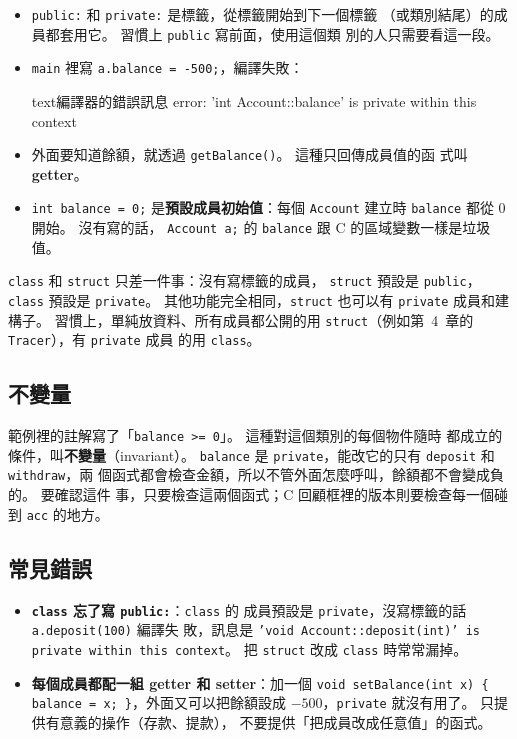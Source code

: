 \begin{itemize}
\item \texttt{public:} 和 \texttt{private:} 是標籤，從標籤開始到下一個標籤
（或類別結尾）的成員都套用它。 習慣上 \texttt{public} 寫前面，使用這個類
別的人只需要看這一段。
\item \texttt{main} 裡寫 \texttt{a.balance = -500;}，編譯失敗：
\begin{code}{text}{編譯器的錯誤訊息}
error: 'int Account::balance' is private within this context
\end{code}
\item 外面要知道餘額，就透過 \texttt{getBalance()}。 這種只回傳成員值的函
式叫 \textbf{getter}。
\item \texttt{int balance = 0;} 是\textbf{預設成員初始值}：每個
\texttt{Account} 建立時 \texttt{balance} 都從 $0$ 開始。 沒有寫的話，
\texttt{Account a;} 的 \texttt{balance} 跟 C 的區域變數一樣是垃圾值。
\end{itemize}

\texttt{class} 和 \texttt{struct} 只差一件事：沒有寫標籤的成員，
\texttt{struct} 預設是 \texttt{public}，\texttt{class} 預設是
\texttt{private}。 其他功能完全相同，\texttt{struct} 也可以有
\texttt{private} 成員和建構子。 習慣上，單純放資料、所有成員都公開的用
\texttt{struct}（例如第~4~章的 \texttt{Tracer}），有 \texttt{private} 成員
的用 \texttt{class}。

\subsection{不變量}

範例裡的註解寫了「\texttt{balance >= 0}」。 這種對這個類別的每個物件隨時
都成立的條件，叫\textbf{不變量}（invariant）。 \texttt{balance} 是
\texttt{private}，能改它的只有 \texttt{deposit} 和 \texttt{withdraw}，兩
個函式都會檢查金額，所以不管外面怎麼呼叫，餘額都不會變成負的。 要確認這件
事，只要檢查這兩個函式；C 回顧框裡的版本則要檢查每一個碰到 \texttt{acc}
的地方。

\subsection{常見錯誤}

\begin{itemize}
\item \textbf{\texttt{class} 忘了寫 \texttt{public:}}：\texttt{class} 的
成員預設是 \texttt{private}，沒寫標籤的話 \texttt{a.deposit(100)} 編譯失
敗，訊息是 \texttt{'void Account::deposit(int)' is private within this
context}。 把 \texttt{struct} 改成 \texttt{class} 時常常漏掉。
\item \textbf{每個成員都配一組 getter 和 setter}：加一個
\texttt{void setBalance(int x) \{ balance = x; \}}，外面又可以把餘額設成
$-500$，\texttt{private} 就沒有用了。 只提供有意義的操作（存款、提款），
不要提供「把成員改成任意值」的函式。
\end{itemize}

